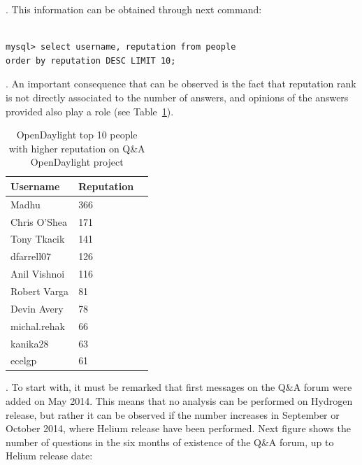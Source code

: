 \documentclass[a4paper, 12pt]{book}
\begin{document}
{. This information can be obtained through next command:

\begin{verbatim}

mysql> select username, reputation from people
order by reputation DESC LIMIT 10;

\end{verbatim}

. An important consequence that can be observed is the fact that reputation rank is not directly associated to the number of answers, and opinions of the answers provided also play a role (see Table~\ref{tab:odl_top_people_reputation}).
\begin{table}
\footnotesize
\begin{center}
\begin{tabular}{|l|l|p{3cm}|}
\hline
\textbf{Username} & \textbf{Reputation} \\ \hline
 Madhu & 366 \\ \hline
 Chris O'Shea & 171 \\ \hline
 Tony Tkacik & 141 \\ \hline
 dfarrell07 & 126 \\ \hline
 Anil Vishnoi & 116 \\ \hline
 Robert Varga & 81 \\ \hline
 Devin Avery & 78 \\ \hline
 michal.rehak & 66 \\ \hline
 kanika28 & 63 \\ \hline
 ecelgp & 61 \\ \hline
\end{tabular}
\end{center}
\caption{OpenDaylight top 10 people with higher reputation on Q\&A OpenDaylight project}
\label{tab:odl_top_people_reputation}
\end{table}
. To start with, it must be remarked that first messages on the Q\&A forum were added on May 2014. This means that no analysis can be performed on Hydrogen release, but rather it can be observed if the number increases in September or October 2014, where Helium release have been performed. Next figure shows the number of questions in the six months of existence of the Q\&A forum, up to Helium release date:
}
\end{document}
